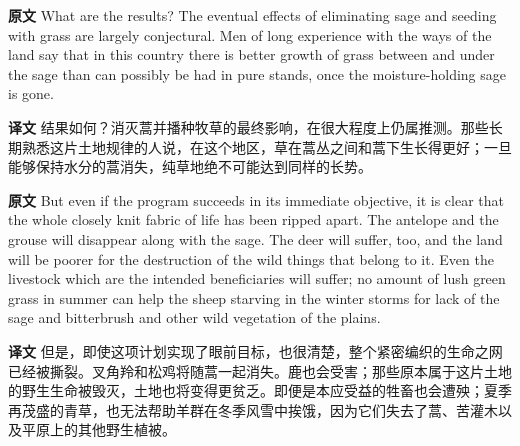 \documentclass[UTF8,zihao=-4]{ctexart}
\begin{document}
\noindent\textbf{原文} What are the results? The eventual effects of eliminating sage and seeding with grass are largely conjectural. Men of long experience with the ways of the land say that in this country there is better growth of grass between and under the sage than can possibly be had in pure stands, once the moisture-holding sage is gone.
\par
\noindent\textbf{译文} 结果如何？消灭蒿并播种牧草的最终影响，在很大程度上仍属推测。那些长期熟悉这片土地规律的人说，在这个地区，草在蒿丛之间和蒿下生长得更好；一旦能够保持水分的蒿消失，纯草地绝不可能达到同样的长势。
\par\medskip

\noindent\textbf{原文} But even if the program succeeds in its immediate objective, it is clear that the whole closely knit fabric of life has been ripped apart. The antelope and the grouse will disappear along with the sage. The deer will suffer, too, and the land will be poorer for the destruction of the wild things that belong to it. Even the livestock which are the intended beneficiaries will suffer; no amount of lush green grass in summer can help the sheep starving in the winter storms for lack of the sage and bitterbrush and other wild vegetation of the plains.
\par
\noindent\textbf{译文} 但是，即使这项计划实现了眼前目标，也很清楚，整个紧密编织的生命之网已经被撕裂。叉角羚和松鸡将随蒿一起消失。鹿也会受害；那些原本属于这片土地的野生生命被毁灭，土地也将变得更贫乏。即便是本应受益的牲畜也会遭殃；夏季再茂盛的青草，也无法帮助羊群在冬季风雪中挨饿，因为它们失去了蒿、苦灌木以及平原上的其他野生植被。
\par\medskip
\end{document}
